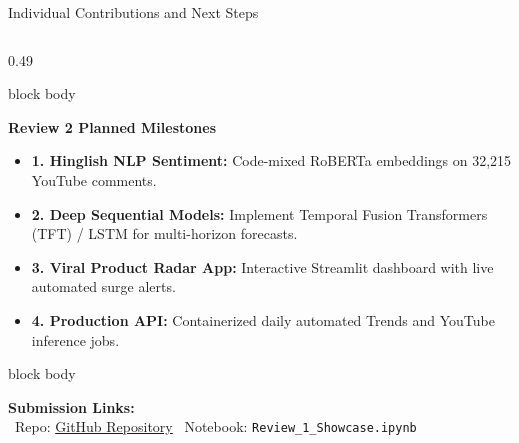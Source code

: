 \documentclass[aspectratio=169, 10pt]{beamer}
\newenvironment{card}[1][]{%
    \begin{beamercolorbox}[rounded=true,shadow=false,wd=\linewidth,sep=4pt,#1]{block body}%
}{%
    \end{beamercolorbox}%
}
\begin{document}
\begin{frame}{Individual Contributions and Next Steps}
\begin{columns}[T]
        \begin{column}{0.49\textwidth}
            \begin{card}
                {\fontsize{8.5pt}{10pt}\selectfont \textbf{\color{BlueAccent}Review 2 Planned Milestones}}\\[0.08cm]
                \begin{itemize}\setlength{\itemsep}{2pt}
                    \item \textbf{1. Hinglish NLP Sentiment:} Code-mixed RoBERTa embeddings on 32,215 YouTube comments.
                    \item \textbf{2. Deep Sequential Models:} Implement Temporal Fusion Transformers (TFT) / LSTM for multi-horizon forecasts.
                    \item \textbf{3. Viral Product Radar App:} Interactive Streamlit dashboard with live automated surge alerts.
                    \item \textbf{4. Production API:} Containerized daily automated Trends and YouTube inference jobs.
                \end{itemize}
            \end{card}
            \vspace{0.12cm}
            \begin{card}
                {\fontsize{7.5pt}{9pt}\selectfont \textbf{Submission Links:}\\
                \textbullet\ Repo: \href{https://github.com/Ashwin-deals/viral-product-intelligence-}{GitHub Repository} \textbullet\ Notebook: \texttt{Review\_1\_Showcase.ipynb}}
            \end{card}
        \end{column}
    \end{columns}
\end{frame}
\end{document}
